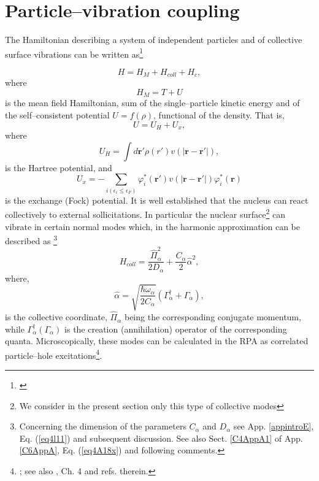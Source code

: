 \section{Particle--vibration coupling}\label{appintroD}
The Hamiltonian describing a system of independent particles and of collective surface vibrations can be written as\footnote{\cite{Bohr:75,Brink:05}}

\begin{equation}\label{eqn:30}
H = H_M  + H_{coll} + H_{c} ,
\end{equation}
where
\begin{equation}
H_M=T+U
\end{equation}
is the mean field Hamiltonian, sum of the single--particle kinetic energy and of the self--consistent potential $U=f(\rho)$, functional of the  density. That is,
\begin{equation}
U=U_H+U_x,
\end{equation}
where
\begin{equation}
U_H=\int d\mathbf r'\rho(r')v(|\mathbf r- \mathbf r'|),
\end{equation}
is the Hartree potential, and
\begin{equation}
U_x=-\sum_{i(\epsilon_i\leq\epsilon_F)}\varphi_i^*(\mathbf r')v(|\mathbf r- \mathbf r'|)\varphi_i^*(\mathbf r)
\end{equation}
is the exchange (Fock) potential. It is well established that the nucleus can react collectively to external sollicitations. In particular the nuclear surface\footnote{We consider in the present section only this type of collective modes} can vibrate in certain normal modes which, in the harmonic approximation can be described as \footnote{Concerning the dimension of the parameters $C_\alpha$ and $D_\alpha$ see App. \ref{appintroE}, Eq. (\ref{eq4l11}) and subsequent discussion. See also Sect. \ref{C4AppA1} of App. \ref{C6AppA}, Eq. (\ref{eq4A18x}) and following comments.}
 \begin{equation}
H_{coll}=\frac{\hat\Pi_\alpha^2}{2D_\alpha}+\frac{C_\alpha}{2}\hat\alpha^2,
 \end{equation}
 where,  
 \begin{equation}
\hat\alpha=\sqrt{\frac{\hbar \omega_\alpha}{2C_\alpha}}\left(\Gamma^\dagger_\alpha+\Gamma_\alpha\right),
 \end{equation}
 is the collective coordinate, $\hat\Pi_\alpha$ being the corresponding conjugate momentum, while $\Gamma^\dagger_\alpha(\Gamma_\alpha)$ is the creation (annihilation) operator of the corresponding quanta. Microscopically, these modes can be calculated in the RPA as correlated particle--hole excitations\footnote{\cite{Bohm:51,Bohm:52,Bohm:53}; see also \cite{Bertsch:05}, Ch. 4 and refs. therein.}.
 
